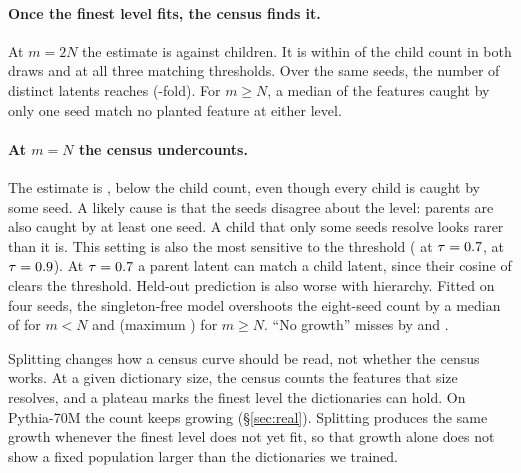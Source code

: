 \paragraph{Once the finest level fits, the census finds it.} At $m=2N$ the estimate is \HierSfDouble{} against \HierChildren{} children. It is within \HierSfErrDouble{} of the child count in both draws and at all three matching thresholds. Over the same seeds, the number of distinct latents reaches \HierUnionDouble{} (\HierUnionRatioMax-fold). For $m\ge N$, a median \HierJunkSingle{} of the features caught by only one seed match no planted feature at either level.

\paragraph{At $m=N$ the census undercounts.} The estimate is \HierSfFull{}, \HierSfErrFull{} below the child count, even though every child is caught by some seed. A likely cause is that the seeds disagree about the level: \HierParsFull{} parents are also caught by at least one seed. A child that only some seeds resolve looks rarer than it is. This setting is also the most sensitive to the threshold (\HierSfFullTauLo{} at $\tau=0.7$, \HierSfFullTauHi{} at $\tau=0.9$). At $\tau=0.7$ a parent latent can match a child latent, since their cosine of \HierParentCos{} clears the threshold. Held-out prediction is also worse with hierarchy. Fitted on four seeds, the singleton-free model overshoots the eight-seed count by a median of \HeldHierSmallSfMed{} for $m<N$ and \HeldHierBigSfMed{} (maximum \HeldHierBigSfMax) for $m\ge N$. ``No growth'' misses by \HeldHierSmallNoGrowthMed{} and \HeldHierBigNoGrowthMed{}.

Splitting changes how a census curve should be read, not whether the census works. At a given dictionary size, the census counts the features that size resolves, and a plateau marks the finest level the dictionaries can hold. On Pythia-70M the count keeps growing (\S\ref{sec:real}). Splitting produces the same growth whenever the finest level does not yet fit, so that growth alone does not show a fixed population larger than the dictionaries we trained.
